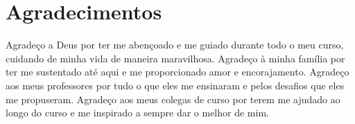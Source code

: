 \chapter*{Agradecimentos}

Agradeço a Deus por ter me abençoado e me guiado durante todo o meu curso, cuidando de minha vida de maneira maravilhosa.
Agradeço à minha família por ter me sustentado até aqui e me proporcionado amor e encorajamento.
Agradeço aos meus professores por tudo o que eles me ensinaram e pelos desafios que eles me propuseram.
Agradeço aos meus colegas de curso por terem me ajudado ao longo do curso e me inspirado a sempre dar o melhor de mim.
